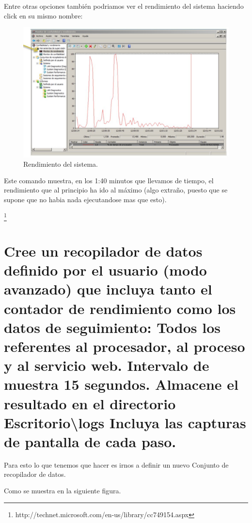Entre otras opciones también podriamos ver el rendimiento del sistema haciendo click en su mismo nombre:

\begin{figure}[H]
\begin{center}
\includegraphics[scale=0.4]{imagenes/ejercicio4-3.eps}
\caption{Rendimiento del sistema.}
\end{center}
\end{figure}

Este comando muestra, en los 1:40 minutos que llevamos de tiempo, el rendimiento que al principio ha ido al máximo (algo extraño, puesto que se supone que no habia nada ejecutandose mas que esto).

\footnote{http://technet.microsoft.com/en-us/library/cc749154.aspx}

\section{ Cree un recopilador de datos definido por el usuario (modo avanzado) que incluya tanto el contador de rendimiento como los datos de seguimiento: Todos los referentes al procesador, al proceso y al servicio web. Intervalo de muestra 15 segundos. Almacene el resultado en el directorio Escritorio\textbackslash{}logs Incluya las capturas de pantalla de cada paso.}

Para esto lo que tenemos que hacer es irnos a definir un nuevo Conjunto de recopilador de datos.

Como se muestra en la siguiente figura.

